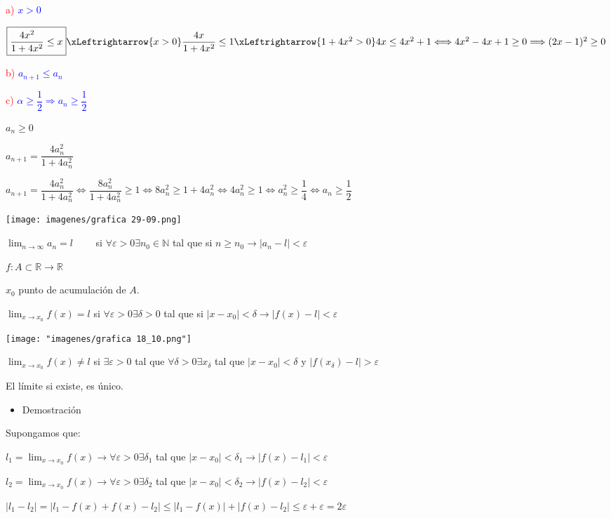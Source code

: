 \documentclass[12pt]{article}
\begin{document}
\textcolor{red}{a)} \textcolor{blue}{$x>0$}

$\boxed{\dfrac{4x^2}{1+4x^2}\le x}\xLeftrightarrow{x>0}\dfrac{4x}{1+4x^2}\le 1\xLeftrightarrow{1+4x^2>0}4x\le 4x^2+1\Longleftrightarrow 4x^2-4x+1\ge 0\Longrightarrow (2x-1)^2\ge0$

\textcolor{red}{b) }\textcolor{blue}{$a_{n+1}\le a_n$}

\textcolor{red}{c) }\textcolor{blue}{$\alpha\ge \dfrac{1}{2}\Longrightarrow a_n\ge\dfrac{1}{2}$}

$a_n\ge 0$

$a_{n+1}=\dfrac{4a_n^2}{1+4a_n^2}$

$a_{n+1}=\dfrac{4a_{n}^2}{1+4a_n^2}\Longleftrightarrow\dfrac{8a_n^2}{1+4a_n^2}\ge 1\Longleftrightarrow 8a_n^2\ge 1+4a_n^2\Longleftrightarrow 4a_n^2\ge 1\Longleftrightarrow a_n^2\ge\dfrac{1}{4}\Longleftrightarrow\boxed{a_n\ge\dfrac{1}{2}}$
 

\texttt{[image: imagenes/grafica 29-09.png]}

$\lim_{n\to\infty}a_n=l\qquad$ si $\forall\varepsilon>0\exists n_0\in\mathbb{N}$ tal que si $n\ge n_0\rightarrow|a_n-l|<\varepsilon$

$f:A\subset\mathbb{R}\longrightarrow\mathbb{R}$

$x_0$ punto de acumulación de $A$.

$\lim_{x\to x_0}f(x)=l$ si $\forall\varepsilon>0\exists\delta>0$ tal que si $|x-x_0|<\delta\longrightarrow|f(x)-l|<\varepsilon$


\texttt{[image: "imagenes/grafica 18\_10.png"]}

$\lim_{x \to x_0}f(x)\neq l$ si $\exists\varepsilon>0$ tal que $\forall\delta>0\exists x_\delta$ tal que $|x-x_0|<\delta$ y $\left|f(x_\delta)-l\right|>\varepsilon$

El límite si existe, es único.
\begin{itemize}[label=\color{red}\textbullet, leftmargin=*]
	\item \color{lightblue}Demostración
\end{itemize}
Supongamos que: 

$l_1=\lim_{x\to x_0}f(x)\rightarrow\forall\varepsilon>0\exists\delta_1$ tal que $|x-x_0|<\delta_1\longrightarrow\boxed{|f(x)-l_1|<\varepsilon}$

$l_2=\lim_{x\to x_0}f(x)\rightarrow\forall\varepsilon>0\exists\delta_2$ tal que $|x-x_0|<\delta_2\longrightarrow\boxed{|f(x)-l_2|<\varepsilon}$

$|l_1-l_2|=|l_1-f(x)+f(x)-l_2|\le |l_1-f(x)|+|f(x)-l_2|\le\varepsilon+\varepsilon=2\varepsilon$
\end{document}
